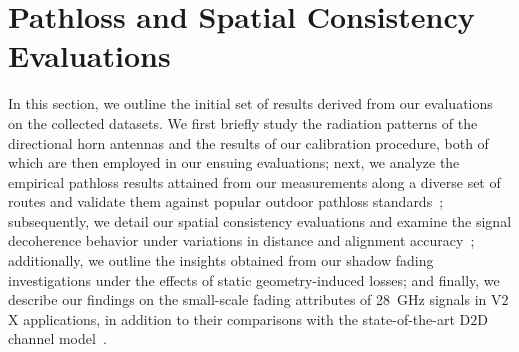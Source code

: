 \documentclass[12pt, draftcls, onecolumn]{IEEEtran}
\begin{document}
{%
\section{Pathloss and Spatial Consistency Evaluations}\label{S4}
In this section, we outline the initial set of results derived from our evaluations on the collected datasets. We first briefly study the radiation patterns of the directional horn antennas and the results of our calibration procedure, both of which are then employed in our ensuing evaluations; next, we analyze the empirical pathloss results attained from our measurements along a diverse set of routes and validate them against popular outdoor pathloss standards~\cite{MacCartneyModelsOverview}; subsequently, we detail our spatial consistency evaluations and examine the signal decoherence behavior under variations in distance and alignment accuracy~\cite{SpatialConsistencyOriginal}; additionally, we outline the insights obtained from our shadow fading investigations under the effects of static geometry-induced losses; and finally, we describe our findings on the small-scale fading attributes of \SI{28}{\giga\hertz} signals in V$2$X applications, in addition to their comparisons with the state-of-the-art D$2$D channel model~\cite{D2DHumanBlockage}. 

}
\end{document}
